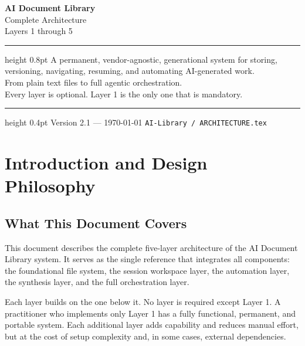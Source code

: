 \documentclass[12pt,letterpaper]{article}
\begin{document}
\begin{titlepage}
\centering
\vspace*{1in}
{\Huge\bfseries AI Document Library}\\[10pt]
{\Large Complete Architecture}\\[8pt]
{\large Layers 1 through 5}\\[20pt]
\hrule height 0.8pt
\vspace{14pt}
{\normalsize
A permanent, vendor-agnostic, generational system for storing,\\
versioning, navigating, resuming, and automating AI-generated work.\\[8pt]
From plain text files to full agentic orchestration.\\
Every layer is optional. Layer 1 is the only one that is mandatory.
}
\vspace{14pt}
\hrule height 0.4pt
\vspace{28pt}
{\small Version 2.1 \quad --- \quad \today}
\vfill
{\footnotesize\texttt{AI-Library / ARCHITECTURE.tex}}
\end{titlepage}

\newpage
\tableofcontents
\newpage

\section{Introduction and Design Philosophy}

\subsection{What This Document Covers}

This document describes the complete five-layer architecture of the AI Document
Library system. It serves as the single reference that integrates all components:
the foundational file system, the session workspace layer, the automation layer,
the synthesis layer, and the full orchestration layer.

Each layer builds on the one below it. No layer is required except Layer 1.
A practitioner who implements only Layer 1 has a fully functional, permanent,
and portable system. Each additional layer adds capability and reduces manual
effort, but at the cost of setup complexity and, in some cases, external
dependencies.
\end{document}
